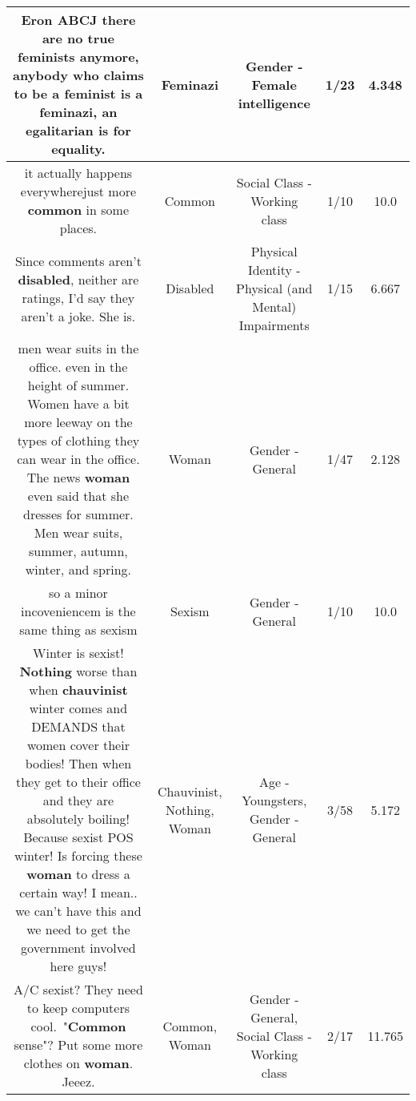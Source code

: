 \documentclass[11pt]{article}
\newlength\mylength
\begin{document}
\begin{center}
\begin{longtable}{|C{.65\mylength}|C{.30\mylength}|C{.12\mylength}|C{.12\mylength}|C{.12\mylength}|}
  \small Eron ABCJ there are no true feminists anymore, anybody who claims to be a feminist is a \textbf{feminazi}, an egalitarian is for equality.\normalsize   & Feminazi & Gender - Female intelligence & 1/23 & 4.348 \\  \hline
  \small it actually happens everywherejust more \textbf{common} in some places.\normalsize   & Common & Social Class - Working class & 1/10 & 10.0 \\  \hline
  \small Since comments aren't \textbf{disabled}, neither are ratings, I'd say they aren't a joke. She is.\normalsize   & Disabled & Physical Identity - Physical (and Mental) Impairments & 1/15 & 6.667 \\  \hline
  \small men wear suits in the office.  even in the height of summer.  Women have a bit more leeway on the types of clothing they can wear in the office.  The news \textbf{woman} even said that she dresses for summer.  Men wear suits, summer, autumn, winter, and spring.\normalsize   & Woman & Gender - General & 1/47 & 2.128 \\  \hline
  \small so a minor incoveniencem is the same thing as sexism\normalsize   & Sexism & Gender - General & 1/10 & 10.0 \\  \hline
  \small Winter is sexist! \textbf{Nothing} worse than when \textbf{chauvinist} winter comes and DEMANDS that women cover their bodies! Then when they get to their office and they are absolutely boiling! Because sexist POS winter! Is forcing these \textbf{woman} to dress a certain way! I mean.. we can't have this and we need to get the government involved here guys!\normalsize   & Chauvinist, Nothing, Woman & Age - Youngsters, Gender - General & 3/58 & 5.172 \\  \hline
  \small A/C sexist? They need to keep computers cool. "\textbf{Common} sense"? Put some more clothes on \textbf{woman}. Jeeez.\normalsize   & Common, Woman & Gender - General, Social Class - Working class & 2/17 & 11.765 \\  \hline

\end{longtable}
\end{center}
\end{document}
